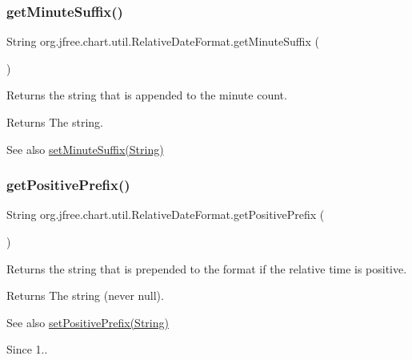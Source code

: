 \subsubsection{\texorpdfstring{get\+Minute\+Suffix()}{getMinuteSuffix()}}
{\footnotesize\ttfamily String org.\+jfree.\+chart.\+util.\+Relative\+Date\+Format.\+get\+Minute\+Suffix (\begin{DoxyParamCaption}{ }\end{DoxyParamCaption})}

Returns the string that is appended to the minute count.

\begin{DoxyReturn}{Returns}
The string.
\end{DoxyReturn}
\begin{DoxySeeAlso}{See also}
\mbox{\hyperlink{classorg_1_1jfree_1_1chart_1_1util_1_1_relative_date_format_af5699d455b828c1b1f9dc67eabe64d7c}{set\+Minute\+Suffix(\+String)}} 
\end{DoxySeeAlso}
\mbox{\label{classorg_1_1jfree_1_1chart_1_1util_1_1_relative_date_format_a10c531ab32ba29c56cd4d89869507be7}} 
\subsubsection{\texorpdfstring{get\+Positive\+Prefix()}{getPositivePrefix()}}
{\footnotesize\ttfamily String org.\+jfree.\+chart.\+util.\+Relative\+Date\+Format.\+get\+Positive\+Prefix (\begin{DoxyParamCaption}{ }\end{DoxyParamCaption})}

Returns the string that is prepended to the format if the relative time is positive.

\begin{DoxyReturn}{Returns}
The string (never {\ttfamily null}).
\end{DoxyReturn}
\begin{DoxySeeAlso}{See also}
\mbox{\hyperlink{classorg_1_1jfree_1_1chart_1_1util_1_1_relative_date_format_af8a2bab7d176504b80e06476e3c7850c}{set\+Positive\+Prefix(\+String)}}
\end{DoxySeeAlso}
\begin{DoxySince}{Since}
1.. 
\end{DoxySince}
\mbox{\label{classorg_1_1jfree_1_1chart_1_1util_1_1_relative_date_format_a107f720128aa5e6b20d710a5ea227c09}} 
